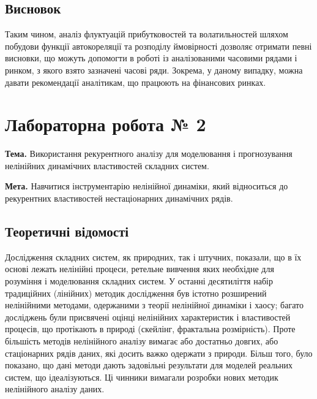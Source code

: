\documentclass[
  letterpaper,
]{report}
\begin{document}
\hypertarget{ux432ux438ux441ux43dux43eux432ux43eux43a}{%
\section{Висновок}\label{ux432ux438ux441ux43dux43eux432ux43eux43a}}

Таким чином, аналіз флуктуацій прибутковостей та волатильностей шляхом
побудови функції автокореляції та розподілу ймовірності дозволяє
отримати певні висновки, що можуть допомогти в роботі із аналізованими
часовими рядами і ринком, з якого взято зазначені часові ряди. Зокрема,
у даному випадку, можна давати рекомендації аналітикам, що працюють на
фінансових ринках.


\hypertarget{ux43bux430ux431ux43eux440ux430ux442ux43eux440ux43dux430-ux440ux43eux431ux43eux442ux430-2}{%
\chapter{Лабораторна робота №
2}\label{ux43bux430ux431ux43eux440ux430ux442ux43eux440ux43dux430-ux440ux43eux431ux43eux442ux430-2}}

\textbf{Тема.} Використання рекурентного аналізу для моделювання і
прогнозування нелінійних динамічних властивостей складних систем.

\textbf{Мета.} Навчитися інструментарію нелінійної динаміки, який
відноситься до рекурентних властивостей нестаціонарних динамічних рядів.

\hypertarget{ux442ux435ux43eux440ux435ux442ux438ux447ux43dux456-ux432ux456ux434ux43eux43cux43eux441ux442ux456-1}{%
\section{Теоретичні
відомості}\label{ux442ux435ux43eux440ux435ux442ux438ux447ux43dux456-ux432ux456ux434ux43eux43cux43eux441ux442ux456-1}}

Дослідження складних систем, як природних, так і штучних, показали, що в
їх основі лежать нелінійні процеси, ретельне вивчення яких необхідне для
розуміння і моделювання складних систем. У останні десятиліття набір
традиційних (лінійних) методик дослідження був істотно розширений
нелінійними методами, одержаними з теорії нелінійної динаміки і хаосу;
багато досліджень були присвячені оцінці нелінійних характеристик і
властивостей процесів, що протікають в природі (скейлінг, фрактальна
розмірність). Проте більшість методів нелінійного аналізу вимагає або
достатньо довгих, або стаціонарних рядів даних, які досить важко
одержати з природи. Більш того, було показано, що дані методи дають
задовільні результати для моделей реальних систем, що ідеалізуються. Ці
чинники вимагали розробки нових методик нелінійного аналізу даних.
\end{document}
